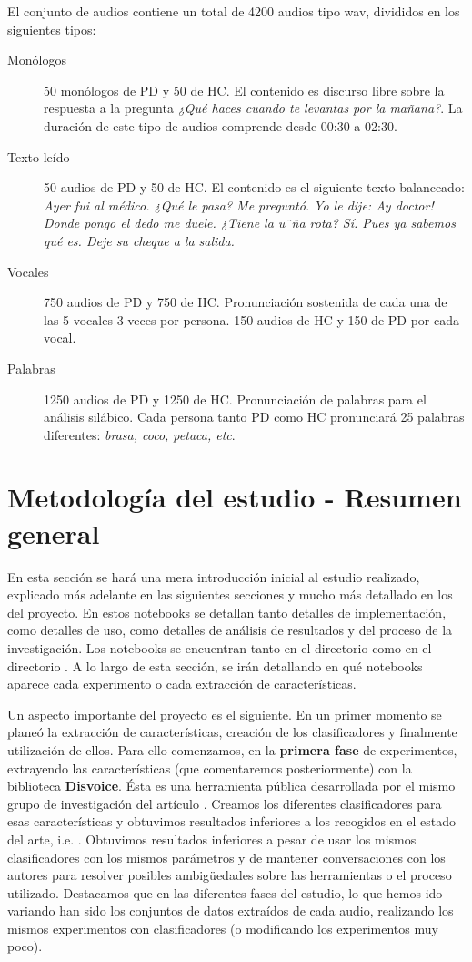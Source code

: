 El conjunto de audios contiene un total de 4200 audios tipo wav, divididos en los siguientes tipos:
\begin{description}
	\item[Monólogos] 50 monólogos de PD y 50 de HC. El contenido es discurso libre sobre la respuesta a la pregunta \textit{¿Qué haces cuando te levantas por la mañana?}. La duración de este tipo de audios comprende desde 00:30 a 02:30.
	\item[Texto leído] 50 audios de PD y 50 de HC. El contenido es el siguiente texto balanceado: \textit{Ayer fui al médico. ¿Qué le pasa? Me preguntó. Yo le dije: Ay doctor! Donde pongo el dedo me duele. ¿Tiene la u˜ña rota? Sí. Pues ya sabemos qué es. Deje su cheque a la salida.}
	\item[Vocales] 750 audios de PD y 750 de HC. Pronunciación sostenida de cada una de las 5 vocales 3 veces por persona. 150 audios de HC y 150 de PD por cada vocal.
	\item[Palabras] 1250 audios de PD y 1250 de HC. Pronunciación de palabras para el análisis silábico. Cada persona tanto PD como HC pronunciará 25 palabras diferentes: \textit{brasa, coco, petaca, etc}.
\end{description}

\section{Metodología del estudio - Resumen general}
En esta sección se hará una mera introducción inicial al estudio realizado, explicado más adelante en las siguientes secciones y mucho más detallado en los  del proyecto. En estos notebooks se detallan tanto detalles de implementación, como detalles de uso, como detalles de análisis de resultados y del proceso de la investigación. Los notebooks se encuentran tanto en el directorio  como en el directorio . A lo largo de esta sección, se irán detallando en qué notebooks aparece cada experimento o cada extracción de características.

Un aspecto importante del proyecto es el siguiente. En un primer momento se planeó la extracción de características, creación de los clasificadores y finalmente utilización de ellos. Para ello comenzamos, en la \textbf{primera fase} de experimentos, extrayendo las características (que comentaremos posteriormente) con la biblioteca \textbf{Disvoice}. Ésta es una herramienta pública desarrollada por el mismo grupo de investigación del artículo \cite{Orz2016}. Creamos los diferentes clasificadores para esas características y obtuvimos resultados inferiores a los recogidos en el estado del arte, i.e. \cite{Orz2016}. Obtuvimos resultados inferiores a pesar de usar los mismos clasificadores con los mismos parámetros y de mantener conversaciones con los autores para resolver posibles ambigüedades sobre las herramientas o el proceso utilizado. Destacamos que en las diferentes fases del estudio, lo que hemos ido variando han sido los conjuntos de datos extraídos de cada audio, realizando los mismos experimentos con clasificadores (o modificando los experimentos muy poco).

